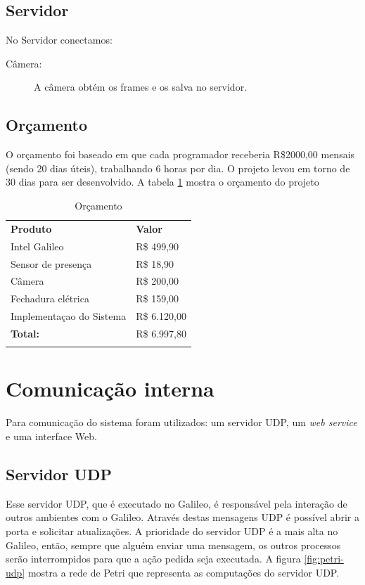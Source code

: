 \documentclass[12pt]{article}
\begin{document}
\subsection{Servidor}
    No Servidor conectamos:
    \begin{description}
        \item[Câmera:] A câmera obtém os frames e os salva no servidor.
    \end{description}

\subsection{Orçamento}
	O orçamento foi baseado em que cada programador receberia R\$2000,00 mensais
	(sendo 20 dias úteis), trabalhando 6 horas por dia. O projeto levou em torno
	de 30 dias para ser desenvolvido. A tabela \ref{orcamento} mostra o orçamento
	do projeto

	\begin{table}[]
	\centering
	\caption{Orçamento}
	\label{orcamento}
	\begin{tabular}{ll}
	\textbf{Produto}         & \textbf{Valor} \\
	Intel Galileo            & R\$ 499,90     \\
	Sensor de presença       & R\$ 18,90      \\
	Câmera                   & R\$ 200,00     \\
	Fechadura elétrica       & R\$ 159,00     \\
	Implementaçao do Sistema & R\$ 6.120,00   \\
	\textbf{Total:}          & R\$ 6.997,80   \\
                         &
	\end{tabular}
	\end{table}






\section{Comunicação interna}
    Para comunicação do sistema foram utilizados: um servidor UDP, um
    \textit{web service} e uma interface Web.
\subsection{Servidor UDP}
    Esse servidor UDP, que é executado no Galileo, é responsável pela interação
    de outros ambientes com o Galileo. Através destas mensagens UDP é possível
    abrir a porta e solicitar atualizações.
    A prioridade do servidor UDP é a mais alta no Galileo, então, sempre que
    alguém enviar uma mensagem, os outros processos serão interrompidos para que
    a ação pedida seja executada. A figura \ref{fig:petri-udp} mostra a rede de
    Petri que representa as computações do servidor UDP.
\end{document}
